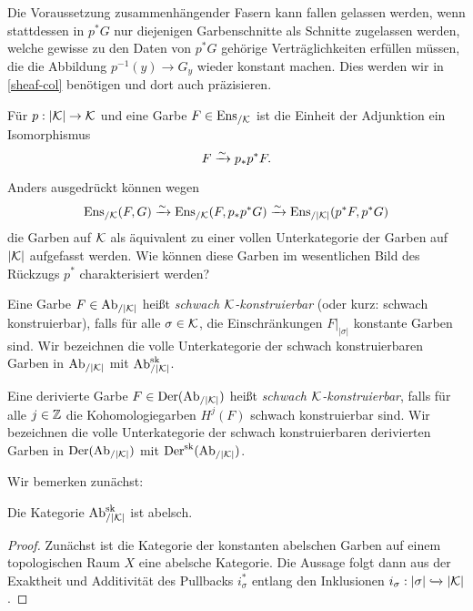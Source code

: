 \begin{bem} \label{connected-fibers-subst}
  Die Voraussetzung zusammenhängender Fasern kann fallen gelassen
  werden, wenn stattdessen in $p^* G$ nur diejenigen Garbenschnitte
  als Schnitte zugelassen werden, welche gewisse zu den Daten von $p^*
  G$ gehörige Verträglichkeiten erfüllen müssen, die die Abbildung
  $p^{-1}(y) \to G_y$ wieder konstant machen. Dies werden wir in
  \ref{sheaf-col} benötigen und dort auch präzisieren.
\end{bem}
\begin{kor} \label{unit-iso}
  Für $p: |\mathcal{K}| \to \mathcal{K}$ und eine Garbe $F \in \operatorname{Ens}_{/\mathcal{K}}$ ist die
  Einheit der Adjunktion ein Isomorphismus
  \[ F \xrightarrow[]{\sim} p_* p^* F . \]
\end{kor}
Anders ausgedrückt können wegen
\[ \operatorname{Ens}_{/\mathcal{K}}(F, G) \xrightarrow[]{\sim} \operatorname{Ens}_{/\mathcal{K}}(F, p_* p^* G)
\xrightarrow[]{\sim} \operatorname{Ens}_{/|\mathcal{K}|}(p^* F, p^* G)
\]
die Garben auf $\mathcal{K}$ als äquivalent zu einer vollen Unterkategorie der
Garben auf $|\mathcal{K}|$ aufgefasst werden. Wie können diese Garben im
wesentlichen Bild des Rückzugs $p^*$ charakterisiert werden?
\begin{defn}
  Eine Garbe $F \in \operatorname{Ab}_{/|\mathcal{K}|}$ heißt \emph{schwach $\mathcal{K}$-konstruierbar}
  (oder kurz: schwach konstruierbar), falls für alle $\sigma \in \mathcal{K}$,
  die Einschränkungen $F|_{|\sigma|}$ konstante Garben sind. Wir
  bezeichnen die volle Unterkategorie der schwach konstruierbaren
  Garben in $\operatorname{Ab}_{/|\mathcal{K}|}$ mit $\operatorname{Ab}_{/|\mathcal{K}|}^{\operatorname{sk}}$.

  Eine derivierte Garbe $F \in \operatorname{Der}(\operatorname{Ab}_{/|\mathcal{K}|})$ heißt \emph{schwach
    $\mathcal{K}$-konstruierbar}, falls für alle $j \in \mathbb{Z}$ die
  Kohomologiegarben $H^j(F)$ schwach konstruierbar sind. Wir
  bezeichnen die volle Unterkategorie der schwach konstruierbaren
  derivierten Garben in $\operatorname{Der}(\operatorname{Ab}_{/|\mathcal{K}|})$ mit $\operatorname{Der}^{\operatorname{sk}}(\operatorname{Ab}_{/|\mathcal{K}|})$.
\end{defn}

Wir bemerken zunächst:
\begin{lemma}[\cite{KS}, 8.1.3] \label{skons-abelian}
  Die Kategorie $\operatorname{Ab}_{/|\mathcal{K}|}^{\operatorname{sk}}$ ist abelsch.
\end{lemma}
\begin{proof}
  Zunächst ist die Kategorie der konstanten abelschen Garben auf einem
  topologischen Raum $X$ eine abelsche Kategorie. Die Aussage folgt
  dann aus der Exaktheit und Additivität des Pullbacks $i_{\sigma}^*$
  entlang den Inklusionen $i_{\sigma}: |\sigma| \xhookrightarrow{}
  |\mathcal{K}|$.
\end{proof}

